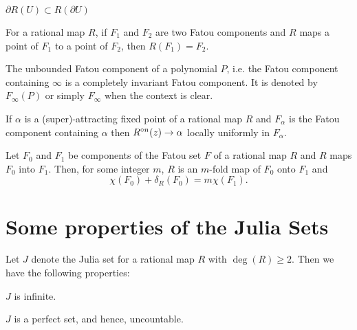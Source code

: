 \begin{theorem}\label{thm1.3}
\( \partial R(U) \subset R(\partial U) \)
\end{theorem}

\begin{lemma}\label{lem1.1}
	For a rational map \( R \), if \( F_1 \) and \( F_2 \) are two Fatou components and \( R \)
	maps a point of \( F_1 \) to a point of \( F_2 \), then \( R(F_1)=F_2 \).
\end{lemma}

\begin{theorem}\label{thm1.4}
	The unbounded Fatou component of a polynomial \( P \), i.e. the Fatou component containing \( \infty \)
	is a completely invariant Fatou component. It is denoted by \( F_\infty(P) \) or simply \( F_\infty \) when
	the context is clear.
\end{theorem}

\begin{theorem}

\end{theorem}

\begin{lemma}\label{lem1.2}
	If \( \alpha \) is a (super)-attracting fixed point of a rational map \( R \) and \( F_\alpha \) is the
	Fatou component containing \( \alpha \) then \( \ror[n](z)\to \alpha \)
	locally uniformly in \( F_\alpha \).
\end{lemma}

\begin{theorem}
	Let \( F_0 \) and \( F_1 \) be components of the Fatou set \( F \) of a rational map \( R \)
	and \( R \) maps \( F_0 \) into \( F_1 \). Then, for some integer \( m \), \( R \) is an \( m \)-fold
	map of \( F_0 \) onto \( F_1 \) and \[
		\chi(F_0)+\delta_R(F_0)=m\chi(F_1)
	.\] 
\end{theorem}

\section{Some properties of the Julia Sets}
Let \( J \) denote the Julia set for a rational map \( R \) with \( \deg(R)\ge 2 \). Then we have the following properties:
\begin{theorem} 
	\( J \) is infinite.
\end{theorem}

\begin{theorem}
	
\end{theorem}

\begin{theorem}
	\( J \) is a perfect set, and hence, uncountable.
\end{theorem}
